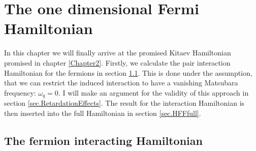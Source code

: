 
\chapter{The one dimensional Fermi Hamiltonian} %

\label{Chapter4} %


In this chapter we will finally arrive at the promised Kitaev Hamiltonian promised in chapter \ref{Chapter2}. Firstly, we calculate the pair interaction Hamiltonian for the fermions in section \ref{sec.HFFint}. This is done under the assumption, that we can restrict the induced interaction to have a vanishing Matsubara frequency: $\omega_q = 0$. I will make an argument for the validity of this approach in section \ref{sec.RetardationEffects}. The result for the interaction Hamiltonian is then inserted into the full Hamiltonian in section \ref{sec.HFFfull}. 

\section{The fermion interacting Hamiltonian} \label{sec.HFFint}

